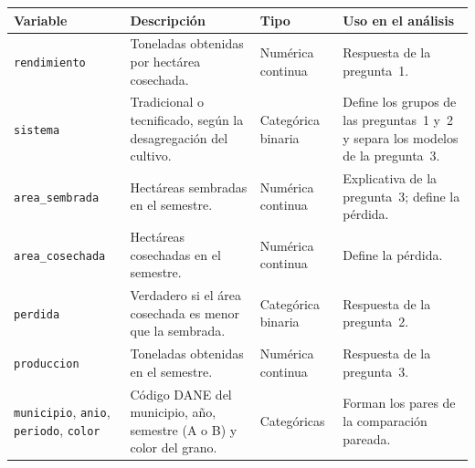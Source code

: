 \documentclass[12pt,letterpaper]{article}
\begin{document}
\begin{bloque}

\begin{apacuerpo}
\noindent\footnotesize
\setlength{\tabcolsep}{4pt}
\begin{tabular}{@{}L{3.1cm} L{6.0cm} L{2.6cm} L{3.9cm}@{}}
\hline
\textbf{Variable} & \textbf{Descripción} & \textbf{Tipo} & \textbf{Uso en el análisis} \\
\hline
\texttt{rendimiento} & Toneladas obtenidas por hectárea cosechada. & Numérica continua & Respuesta de la pregunta~1. \\
\texttt{sistema} & Tradicional o tecnificado, según la desagregación del cultivo. & Categórica binaria & Define los grupos de las preguntas~1 y~2 y separa los modelos de la pregunta~3. \\
\texttt{area\_sembrada} & Hectáreas sembradas en el semestre. & Numérica continua & Explicativa de la pregunta~3; define la pérdida. \\
\texttt{area\_cosechada} & Hectáreas cosechadas en el semestre. & Numérica continua & Define la pérdida. \\
\texttt{perdida} & Verdadero si el área cosechada es menor que la sembrada. & Categórica binaria & Respuesta de la pregunta~2. \\
\texttt{produccion} & Toneladas obtenidas en el semestre. & Numérica continua & Respuesta de la pregunta~3. \\
\texttt{municipio}, \texttt{anio}, \texttt{periodo}, \texttt{color} & Código DANE del municipio, año, semestre (A o B) y color del grano. & Categóricas & Forman los pares de la comparación pareada. \\
\hline
\end{tabular}
\end{apacuerpo}

\end{bloque}

\vspace{14pt}
\end{document}
